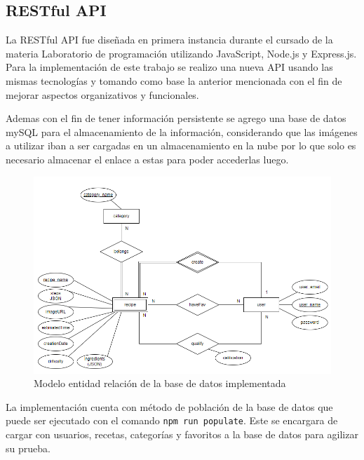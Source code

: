 \subsection{RESTful API}
La RESTful API fue diseñada en primera instancia durante el cursado de la materia Laboratorio de programación utilizando JavaScript, Node.js y Express.js. Para la implementación de este trabajo se realizo una nueva API usando las mismas tecnologías y tomando como base la anterior mencionada con el fin de mejorar aspectos organizativos y funcionales.

Ademas con el fin de tener información persistente se agrego una base de datos mySQL para el almacenamiento de la información, considerando que las imágenes a utilizar iban a ser cargadas en un almacenamiento en la nube por lo que solo es necesario almacenar el enlace a estas para poder accederlas luego.

\begin{figure}[!h]
  \centering
  \includegraphics[width=16cm, scale=1]{Images/Imagenes/MER.png}
  \caption{Modelo entidad relación de la base de datos implementada}
  \label{fig:marcado}
\end{figure}

La implementación cuenta con método de población de la base de datos que puede ser ejecutado con el comando  \texttt{npm run populate}. Este se encargara de cargar con usuarios, recetas, categorías y favoritos a la base de datos para agilizar su prueba.

